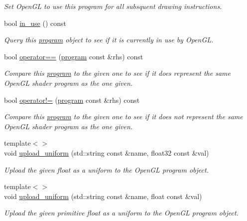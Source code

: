 \begin{DoxyCompactItemize}
\begin{DoxyCompactList}\small\item\em Set Open\-G\-L to use this program for all subsquent drawing instructions. \end{DoxyCompactList}\item 
bool \hyperlink{classgfx_1_1program_a4ba4fb099649e8dce803195d0f692a51}{in\-\_\-use} () const 
\begin{DoxyCompactList}\small\item\em Query this \hyperlink{classgfx_1_1program}{program} object to see if it is currently in use by Open\-G\-L. \end{DoxyCompactList}\item 
bool \hyperlink{classgfx_1_1program_afe778007d42b9ecb15e7818037484204}{operator==} (\hyperlink{classgfx_1_1program}{program} const \&rhs) const 
\begin{DoxyCompactList}\small\item\em Compare this \hyperlink{classgfx_1_1program}{program} to the given one to see if it does represent the same Open\-G\-L shader program as the one given. \end{DoxyCompactList}\item 
bool \hyperlink{classgfx_1_1program_a7c5ac99f3cf6a70d72e8eb58786ce673}{operator!=} (\hyperlink{classgfx_1_1program}{program} const \&rhs) const 
\begin{DoxyCompactList}\small\item\em Compare this \hyperlink{classgfx_1_1program}{program} to the given one to see if it does not represent the same Open\-G\-L shader program as the one given. \end{DoxyCompactList}\item 
{\footnotesize template$<$$>$ }\\void \hyperlink{classgfx_1_1program_ab3b82ebb6938a0a23533d1222dcb3ab1}{upload\-\_\-uniform} (std\-::string const \&name, float32 const \&val)
\begin{DoxyCompactList}\small\item\em Upload the given float as a uniform to the Open\-G\-L program object. \end{DoxyCompactList}\item 
{\footnotesize template$<$$>$ }\\void \hyperlink{classgfx_1_1program_a7ba8ce9e2be0434dc848c60fbc2d726f}{upload\-\_\-uniform} (std\-::string const \&name, float const \&val)
\begin{DoxyCompactList}\small\item\em Upload the given primitive float as a uniform to the Open\-G\-L program object. \end{DoxyCompactList}\item 

\end{DoxyCompactItemize}
